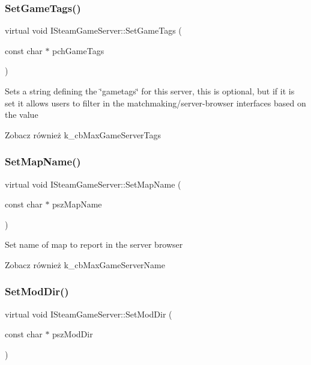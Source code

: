 \subsubsection{\texorpdfstring{Set\+Game\+Tags()}{SetGameTags()}}
{\footnotesize\ttfamily virtual void I\+Steam\+Game\+Server\+::\+Set\+Game\+Tags (\begin{DoxyParamCaption}\item[{const char $\ast$}]{pch\+Game\+Tags }\end{DoxyParamCaption})\hspace{0.3cm}{\ttfamily [pure virtual]}}

Sets a string defining the \char`\"{}gametags\char`\"{} for this server, this is optional, but if it is set it allows users to filter in the matchmaking/server-\/browser interfaces based on the value

\begin{DoxySeeAlso}{Zobacz również}
k\+\_\+cb\+Max\+Game\+Server\+Tags 
\end{DoxySeeAlso}
\mbox{\label{class_i_steam_game_server_a990b3a4d52dfd3353252bb3590274016}} 
\subsubsection{\texorpdfstring{Set\+Map\+Name()}{SetMapName()}}
{\footnotesize\ttfamily virtual void I\+Steam\+Game\+Server\+::\+Set\+Map\+Name (\begin{DoxyParamCaption}\item[{const char $\ast$}]{psz\+Map\+Name }\end{DoxyParamCaption})\hspace{0.3cm}{\ttfamily [pure virtual]}}

Set name of map to report in the server browser

\begin{DoxySeeAlso}{Zobacz również}
k\+\_\+cb\+Max\+Game\+Server\+Name 
\end{DoxySeeAlso}
\mbox{\label{class_i_steam_game_server_aecfcae1904680ae8d49164b4e4eb5e6f}} 
\subsubsection{\texorpdfstring{Set\+Mod\+Dir()}{SetModDir()}}
{\footnotesize\ttfamily virtual void I\+Steam\+Game\+Server\+::\+Set\+Mod\+Dir (\begin{DoxyParamCaption}\item[{const char $\ast$}]{psz\+Mod\+Dir }\end{DoxyParamCaption})\hspace{0.3cm}{\ttfamily [pure virtual]}}

